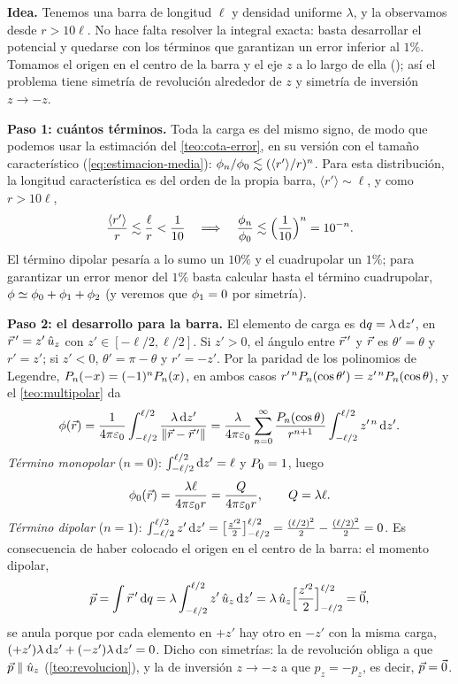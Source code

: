 \begin{resolucion}
\textbf{Idea.} Tenemos una barra de longitud $\ell$ y densidad uniforme $\lambda$, y la observamos desde $r>10\ell$. No hace falta resolver la integral exacta: basta
desarrollar el potencial y quedarse con los términos que garantizan un error inferior al $1\%$. Tomamos el origen en el centro de la barra y el eje $z$ a lo largo de
ella (); así el problema tiene simetría de revolución alrededor de $z$ y simetría de inversión $z\to-z$.

\textbf{Paso 1: cuántos términos.} Toda la carga es del mismo signo, de modo que podemos usar la estimación del \cref{teo:cota-error}, en su versión con el tamaño
característico (\cref{eq:estimacion-media}): $\phi_{n}/\phi_{0}\lesssim(\langle r'\rangle/r)^{n}$. Para esta distribución, la longitud característica es del orden de la
propia barra, $\langle r'\rangle\sim\ell$, y como $r>10\ell$,
\[
  \frac{\langle r'\rangle}{r}\lesssim\frac{\ell}{r}<\frac{1}{10}\quad\Longrightarrow\quad\frac{\phi_{n}}{\phi_{0}}\lesssim\Bigl(\frac{1}{10}\Bigr)^{n}=10^{-n}.
\]
El término dipolar pesaría a lo sumo un $10\%$ y el cuadrupolar un $1\%$; para garantizar un error menor del $1\%$ basta calcular hasta el término cuadrupolar,
$\phi\simeq\phi_{0}+\phi_{1}+\phi_{2}$ (y veremos que $\phi_{1}=0$ por simetría).

\textbf{Paso 2: el desarrollo para la barra.} El elemento de carga es $\mathrm{d} q=\lambda\,\mathrm{d} z'$, en $\vec{r}\,'=z'\,\hat{u}_{z}$ con $z'\in[-\ell/2,\ell/2]$. Si $z'>0$, el ángulo entre $\vec{r}\,'$ y
$\vec{r}$ es $\theta'=\theta$ y $r'=z'$; si $z'<0$, $\theta'=\pi-\theta$ y $r'=-z'$. Por la paridad de los polinomios de Legendre, $P_{n}(-x)=(-1)^{n}P_{n}(x)$, en ambos casos
$r'^{\,n}P_{n}(\cos\theta')=z'^{\,n}P_{n}(\cos\theta)$, y el \cref{teo:multipolar} da
\[
  \phi(\vec{r})=\frac{1}{4\pi\varepsilon_{0}}\int_{-\ell/2}^{\ell/2}\frac{\lambda\,\mathrm{d} z'}{\lVert \vec{r}-\vec{r}\,'\rVert}
  =\frac{\lambda}{4\pi\varepsilon_{0}}\sum_{n=0}^{\infty}\frac{P_{n}(\cos\theta)}{r^{n+1}}\int_{-\ell/2}^{\ell/2}z'^{\,n}\,\mathrm{d} z' .
\]
\emph{Término monopolar} ($n=0$): $\int_{-\ell/2}^{\ell/2}\mathrm{d} z'=\ell$ y $P_{0}=1$, luego
\[
  \phi_{0}(\vec{r})=\frac{\lambda\ell}{4\pi\varepsilon_{0} r}=\frac{Q}{4\pi\varepsilon_{0} r},\qquad Q=\lambda\ell .
\]
\emph{Término dipolar} ($n=1$): $\int_{-\ell/2}^{\ell/2}z'\,\mathrm{d} z'=\bigl[\tfrac{z'^{2}}{2}\bigr]_{-\ell/2}^{\ell/2}=\tfrac{(\ell/2)^{2}}{2}-\tfrac{(\ell/2)^{2}}{2}=0$. Es consecuencia de haber
colocado el origen en el centro de la barra: el momento dipolar,
\[
  \vec{p}=\int\vec{r}\,'\,\mathrm{d} q=\lambda\int_{-\ell/2}^{\ell/2}z'\,\hat{u}_{z}\,\mathrm{d} z'=\lambda\,\hat{u}_{z}\Bigl[\frac{z'^{2}}{2}\Bigr]_{-\ell/2}^{\ell/2}=\vec{0},
\]
se anula porque por cada elemento en $+z'$ hay otro en $-z'$ con la misma carga, $(+z')\lambda\,\mathrm{d} z'+(-z')\lambda\,\mathrm{d} z'=0$. Dicho con simetrías: la de revolución obliga a
que $\vec{p}\parallel\hat{u}_{z}$ (\cref{teo:revolucion}), y la de inversión $z\to-z$ a que $p_z=-p_z$, es decir, $\vec{p}=\vec{0}$.


\end{resolucion}
